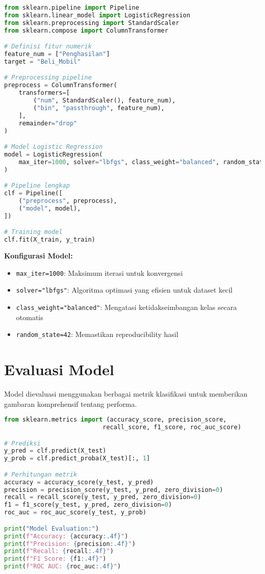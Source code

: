 \documentclass[11pt,a4paper]{article}
\begin{document}
    \begin{codebox}
        \begin{lstlisting}[language=Python]
from sklearn.pipeline import Pipeline
from sklearn.linear_model import LogisticRegression
from sklearn.preprocessing import StandardScaler
from sklearn.compose import ColumnTransformer

# Definisi fitur numerik
feature_num = ["Penghasilan"]
target = "Beli_Mobil"

# Preprocessing pipeline
preprocess = ColumnTransformer(
    transformers=[
        ("num", StandardScaler(), feature_num),
        ("bin", "passthrough", feature_num),
    ],
    remainder="drop"
)

# Model Logistic Regression
model = LogisticRegression(
    max_iter=1000, solver="lbfgs", class_weight="balanced", random_state=42
)

# Pipeline lengkap
clf = Pipeline([
    ("preprocess", preprocess),
    ("model", model),
])

# Training model
clf.fit(X_train, y_train)
        \end{lstlisting}
    \end{codebox}

    \noindent\textbf{Konfigurasi Model:}
    \begin{itemize}
        \item \texttt{max\_iter=1000}: Maksimum iterasi untuk konvergensi
        \item \texttt{solver="lbfgs"}: Algoritma optimasi yang efisien untuk dataset kecil
        \item \texttt{class\_weight="balanced"}: Mengatasi ketidakseimbangan kelas secara otomatis
        \item \texttt{random\_state=42}: Memastikan reproducibility hasil
    \end{itemize}


    \section{Evaluasi Model}
    Model dievaluasi menggunakan berbagai metrik klasifikasi untuk memberikan gambaran komprehensif tentang performa.

    \begin{codebox}
        \begin{lstlisting}[language=Python]
from sklearn.metrics import (accuracy_score, precision_score,
                           recall_score, f1_score, roc_auc_score)

# Prediksi
y_pred = clf.predict(X_test)
y_prob = clf.predict_proba(X_test)[:, 1]

# Perhitungan metrik
accuracy = accuracy_score(y_test, y_pred)
precision = precision_score(y_test, y_pred, zero_division=0)
recall = recall_score(y_test, y_pred, zero_division=0)
f1 = f1_score(y_test, y_pred, zero_division=0)
roc_auc = roc_auc_score(y_test, y_prob)

print("Model Evaluation:")
print(f"Accuracy: {accuracy:.4f}")
print(f"Precision: {precision:.4f}")
print(f"Recall: {recall:.4f}")
print(f"F1 Score: {f1:.4f}")
print(f"ROC AUC: {roc_auc:.4f}")
        \end{lstlisting}
    \end{codebox}
\end{document}
